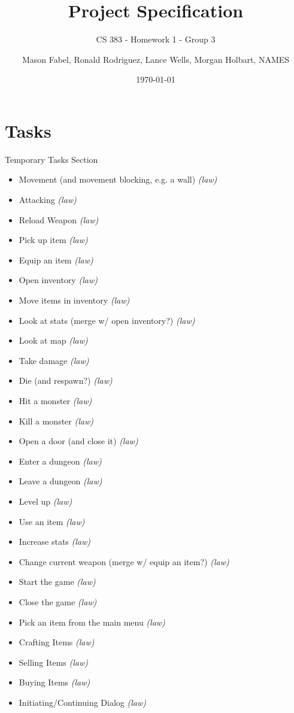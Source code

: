 \documentclass[12pt]{report}
\title{Project Specification}
\subtitle{CS 383 - Homework 1 - Group 3}
\author{Mason Fabel, Ronald Rodriguez, Lance Wells, Morgan Holbart, NAMES} %
\date{\today}
\begin{document}
\maketitle


\chapter{Tasks}

\begin{section}{Temporary Tasks Section}

\begin{itemize}
\item	Movement (and movement blocking, e.g. a wall) \textit{(law)} %
\item	Attacking \textit{(law)} %
\item	Reload Weapon \textit{(law)} %
\item	Pick up item \textit{(law)} %
\item	Equip an item \textit{(law)}
\item	Open inventory \textit{(law)} %
\item	Move items in inventory \textit{(law)}
\item	Look at stats (merge w/ open inventory?) \textit{(law)}
\item	Look at map \textit{(law)}
\item	Take damage \textit{(law)}
\item	Die (and respawn?) \textit{(law)}
\item	Hit a monster \textit{(law)} %
\item	Kill a monster \textit{(law)}
\item	Open a door (and close it) \textit{(law)} %
\item	Enter a dungeon \textit{(law)} %
\item	Leave a dungeon \textit{(law)} %
\item	Level up \textit{(law)}
\item	Use an item \textit{(law)}
\item	Increase stats \textit{(law)}
\item	Change current weapon (merge w/ equip an item?) \textit{(law)}
\item	Start the game \textit{(law)} %
\item	Close the game \textit{(law)}
\item	Pick an item from the main menu \textit{(law)}
\item	Crafting Items \textit{(law)} %
\item	Selling Items \textit{(law)} %
\item	Buying Items \textit{(law)} %
\item	Initiating/Continuing Dialog \textit{(law)} %
\end{itemize}


\end{section}
\end{document}
